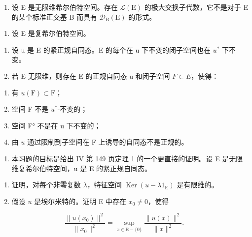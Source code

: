 \begin{enumerate}
\def\labelenumi{\alph{enumi})}
\setcounter{enumi}{1}
\tightlist
\item
  设 E 是无限维希尔伯特空间。存在 \(\mathcal{L}(\mathrm{E})\) 的极大交换子代数，它不是对于 E 的某个标准正交基 B 而具有 \(\mathcal{D}_{\mathrm{B}}(\mathrm{E})\) 的形式。
\end{enumerate}

\begin{enumerate}
\def\labelenumi{\arabic{enumi})}
\setcounter{enumi}{5}
\tightlist
\item
  设 E 是复希尔伯特空间。
\end{enumerate}

\begin{enumerate}
\def\labelenumi{\alph{enumi})}
\item
  设 u 是 E 的紧正规自同态。E 的每个在 u 下不变的闭子空间也在 \(u^{*}\) 下不变。
\item
  若 E 无限维，则存在 E 的正规自同态 u 和闭子空间 \(F \subset E\)，使得：
\end{enumerate}

\begin{enumerate}
\def\labelenumi{(\roman{enumi})}
\item
  有 \(u(\mathrm{F}) \subset \mathrm{F}\)；
\item
  空间 F 不是 \(u^{*}\)-不变的；
\item
  空间 F° 不是在 u 下不变的；
\item
  由 \(u\) 通过限制到子空间在 F 上诱导的自同态不是正规的。
\end{enumerate}

\begin{enumerate}
\def\labelenumi{\arabic{enumi})}
\setcounter{enumi}{6}
\tightlist
\item
  本习题的目标是给出 IV 第 149 页定理 1 的一个更直接的证明。设 E 是无限维复希尔伯特空间，u 是 E 的紧正规自同态。
\end{enumerate}

\begin{enumerate}
\def\labelenumi{\alph{enumi})}
\item
  证明，对每个非零复数 \(\lambda\)，特征空间 \(\operatorname{Ker}(u - \lambda 1_{\mathrm{E}})\) 是有限维的。
\item
  假设 \(u\) 是埃尔米特的。证明 E 中存在 \(x_0 \neq 0\)，使得
\end{enumerate}

\[
\frac {\| u (x _ {0}) \| ^ {2}}{\| x _ {0} \| ^ {2}} = \sup _ {x \in \mathrm{E} - \{0 \}} \frac {\| u (x) \| ^ {2}}{\| x \| ^ {2}}.
\]


